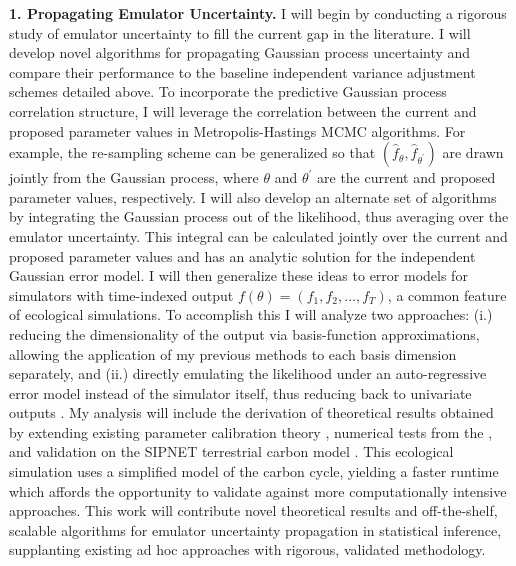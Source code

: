 \documentclass[12pt]{article}
\begin{document}
 \textbf{1. Propagating Emulator Uncertainty.} I will begin by conducting a rigorous study of emulator uncertainty to fill the current gap in the literature. I will develop novel algorithms for propagating Gaussian process uncertainty and compare their performance to the baseline independent variance adjustment schemes detailed above. To incorporate the predictive Gaussian process correlation structure, I will leverage the correlation between the current and proposed parameter values in Metropolis-Hastings MCMC algorithms. For example, the re-sampling scheme \cite{Fer} can be generalized so that 
 $(\hat{f}_{\theta}, \hat{f}_{\theta^\prime})$ are drawn jointly from the Gaussian process, where $\theta$ and $\theta^\prime$ are the current and proposed parameter values, respectively. I will also develop an alternate set of algorithms by integrating the Gaussian process out of the likelihood, thus averaging over the emulator uncertainty. This integral can be calculated jointly over the current and proposed parameter values and has an analytic solution for the independent Gaussian error model. I will then generalize these ideas to error models for simulators with time-indexed output $f(\theta) = (f_1, f_2, \dots, f_T)$, a common feature of ecological simulations. To accomplish this I will analyze two approaches: (i.) reducing the dimensionality of the output via basis-function 
 approximations, allowing the application of my previous methods to each basis dimension separately, and (ii.) directly emulating the likelihood under an auto-regressive error model instead of the simulator itself, thus reducing back to univariate outputs \cite{Fer}.
 My analysis will include the derivation of theoretical results obtained by extending existing parameter calibration theory \cite{Tuo}, numerical tests from the 
  \cite{Surjanovic}, and validation on the SIPNET terrestrial carbon model \cite{Fer}. This ecological simulation uses a simplified model of the carbon cycle, yielding a faster runtime which affords the opportunity to validate against more computationally intensive approaches. This work will contribute novel theoretical results and off-the-shelf, scalable algorithms for emulator uncertainty propagation in statistical inference, supplanting existing ad hoc approaches with rigorous, validated methodology. 
\end{document}
